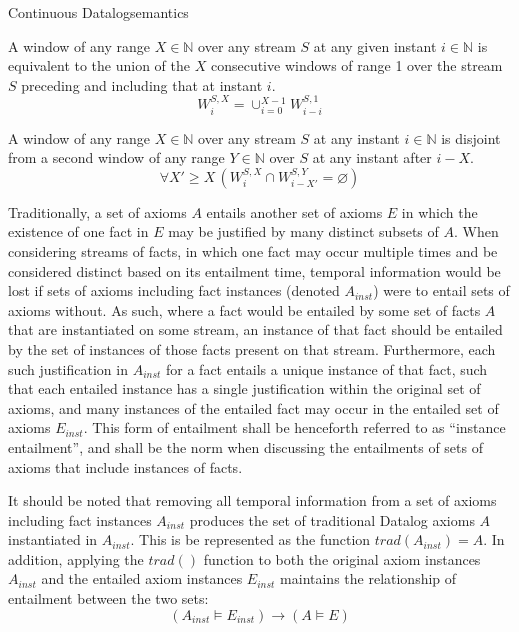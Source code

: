 \begin{nestedsection}{Continuous Datalog}{semantics}
	\begin{axiom}\label{axiom:continuous datalog: window composition}
		A window of any range ${X \in \mathbb{N}}$ over any stream $S$ at any given instant ${i \in \mathbb{N}}$ is equivalent to the union of the $X$ consecutive windows of range 1 over the stream $S$ preceding and including that at instant $i$.
		\begin{equation*}
			W^{S,X}_{i} = \mathop{\cup}_{i=0}^{X-1} W^{S,1}_{i-i}
		\end{equation*}
	\end{axiom}

	\begin{axiom}\label{axiom:continuous datalog: window disjointness}
		A window of any range ${X \in \mathbb{N}}$ over any stream $S$ at any instant ${i \in \mathbb{N}}$ is disjoint from a second window of any range ${Y \in \mathbb{N}}$ over $S$ at any instant after ${i - X}$.
		\begin{equation*}
			\forall X' \geq X \, \left( W^{S,X}_{i} \cap W^{S,Y}_{i-X'} = \varnothing \right)
		\end{equation*}
	\end{axiom}

	Traditionally, a set of axioms $A$ entails another set of axioms $E$ in which the existence of one fact in $E$ may be justified by many distinct subsets of $A$.
	When considering streams of facts, in which one fact may occur multiple times and be considered distinct based on its entailment time, temporal information would be lost if sets of axioms including fact instances (denoted $A_{inst}$) were to entail sets of axioms without.
	As such, where a fact would be entailed by some set of facts $A$ that are instantiated on some stream, an instance of that fact should be entailed by the set of instances of those facts present on that stream.
	Furthermore, each such justification in $A_{inst}$ for a fact entails a unique instance of that fact, such that each entailed instance has a single justification within the original set of axioms, and many instances of the entailed fact may occur in the entailed set of axioms $E_{inst}$.
	This form of entailment shall be henceforth referred to as ``instance entailment'', and shall be the norm when discussing the entailments of sets of axioms that include instances of facts.
	
	It should be noted that removing all temporal information from a set of axioms including fact instances $A_{inst}$ produces the set of traditional Datalog axioms $A$ instantiated in $A_{inst}$.
	This is be represented as the function ${trad\left( A_{inst} \right) = A}$.
	In addition, applying the ${trad()}$ function to both the original axiom instances $A_{inst}$ and the entailed axiom instances $E_{inst}$ maintains the relationship of entailment between the two sets:
	\[ \left( A_{inst} \vDash E_{inst} \right) \rightarrow \left( A \vDash E \right) \]


\end{nestedsection}
